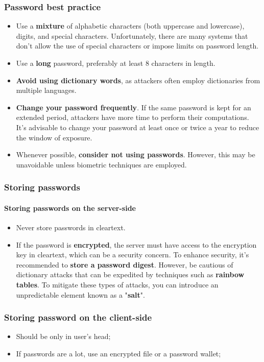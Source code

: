 \subsubsection*{Password best practice}
\begin{itemize}
  \item Use a \textbf{mixture} of alphabetic characters (both uppercase and lowercase), digits, and special characters. Unfortunately, there are many systems that don't allow the use of special characters or impose limits on password length.
  \item Use a \textbf{long} password, preferably at least 8 characters in length.
  \item \textbf{Avoid using dictionary words}, as attackers often employ dictionaries from multiple languages.
  \item \textbf{Change your password frequently}. If the same password is kept for an extended period, attackers have more time to perform their computations. It's advisable to change your password at least once or twice a year to reduce the window of exposure.
  \item Whenever possible, \textbf{consider not using passwords}. However, this may be unavoidable unless biometric techniques are employed.
\end{itemize}

\subsubsection*{Storing passwords}
\paragraph*{Storing passwords on the server-side}
\begin{itemize}
  \item Never store passwords in cleartext.
  \item If the password is \textbf{encrypted}, the server must have access to the encryption key in cleartext, which can be a security concern. To enhance security, it's recommended to \textbf{store a password digest}. However, be cautious of dictionary attacks that can be expedited by techniques such as \textbf{rainbow tables}. To mitigate these types of attacks, you can introduce an unpredictable element known as a "\textbf{salt}".
\end{itemize}


\subsubsection*{Storing password on the client-side}
\begin{itemize}
  \item Should be only in user's head;
  \item If passwords are a lot, use an encrypted file or a password wallet;
\end{itemize}

